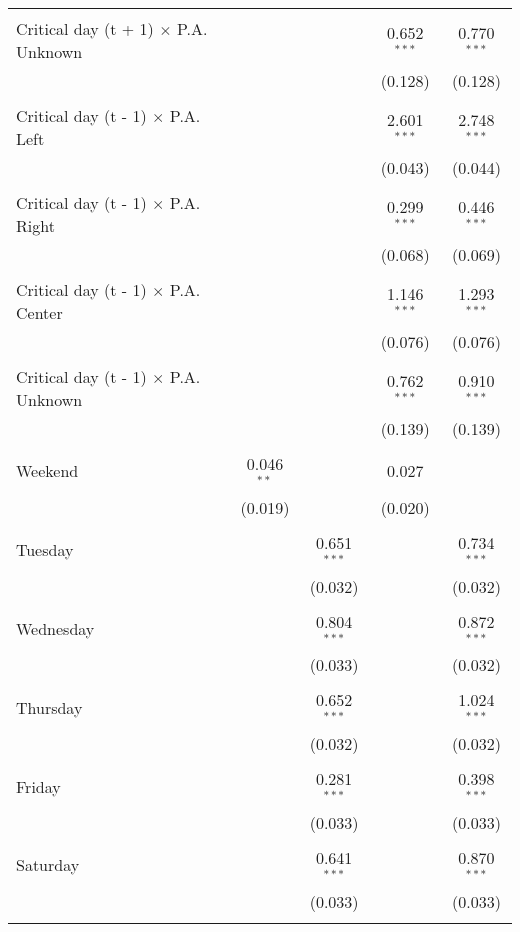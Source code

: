 \documentclass[
]{article}
\begin{document}
\begin{table}[!htbp]
{\begin{tabular}{@{\extracolsep{5pt}}lcccc}
  & & & & \\ 
 Critical day (t + 1) $\times$ P.A. Unknown &  &  & 0.652$^{***}$ & 0.770$^{***}$ \\ 
  &  &  & (0.128) & (0.128) \\ 
  & & & & \\ 
 Critical day (t - 1) $\times$ P.A. Left &  &  & 2.601$^{***}$ & 2.748$^{***}$ \\ 
  &  &  & (0.043) & (0.044) \\ 
  & & & & \\ 
 Critical day (t - 1) $\times$ P.A. Right &  &  & 0.299$^{***}$ & 0.446$^{***}$ \\ 
  &  &  & (0.068) & (0.069) \\ 
  & & & & \\ 
 Critical day (t - 1) $\times$ P.A. Center &  &  & 1.146$^{***}$ & 1.293$^{***}$ \\ 
  &  &  & (0.076) & (0.076) \\ 
  & & & & \\ 
 Critical day (t - 1) $\times$ P.A. Unknown &  &  & 0.762$^{***}$ & 0.910$^{***}$ \\ 
  &  &  & (0.139) & (0.139) \\ 
  & & & & \\ 
 Weekend & 0.046$^{**}$ &  & 0.027 &  \\ 
  & (0.019) &  & (0.020) &  \\ 
  & & & & \\ 
 Tuesday &  & 0.651$^{***}$ &  & 0.734$^{***}$ \\ 
  &  & (0.032) &  & (0.032) \\ 
  & & & & \\ 
 Wednesday &  & 0.804$^{***}$ &  & 0.872$^{***}$ \\ 
  &  & (0.033) &  & (0.032) \\ 
  & & & & \\ 
 Thursday &  & 0.652$^{***}$ &  & 1.024$^{***}$ \\ 
  &  & (0.032) &  & (0.032) \\ 
  & & & & \\ 
 Friday &  & 0.281$^{***}$ &  & 0.398$^{***}$ \\ 
  &  & (0.033) &  & (0.033) \\ 
  & & & & \\ 
 Saturday &  & 0.641$^{***}$ &  & 0.870$^{***}$ \\ 
  &  & (0.033) &  & (0.033) \\ 
  & & & & \\ 

\end{tabular}}
\end{table}
\end{document}
